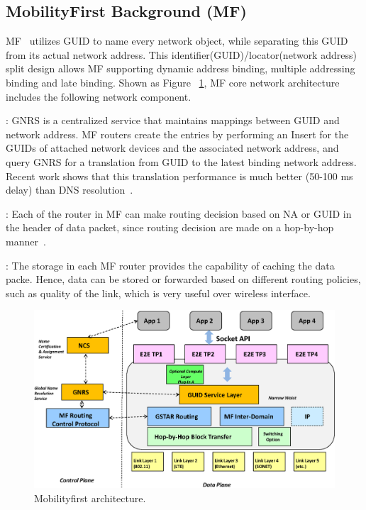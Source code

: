 \subsection{MobilityFirst Background (MF)}\label{sec:intro_mf}
MF~\cite{raychaudhuri2012mobilityfirst} utilizes GUID to name every network object, while separating this GUID from its actual network address. This identifier(GUID)/locator(network address) split design allows MF supporting dynamic address binding, multiple addressing binding and late binding. Shown as Figure ~\ref{fig:mf_arch}, MF core network architecture includes the following network component.

\vspace{1mm}: GNRS is a centralized service that maintains mappings between GUID and network address. MF routers create the entries by performing an Insert for the GUIDs of attached network devices and the associated network address, and query GNRS for a translation from GUID to the latest binding network address. Recent work shows that this translation performance is much better (50-100 ms delay) than DNS resolution~\cite{vu2012dmap}.

\vspace{1mm}: Each of the router in MF can make routing decision based on NA or GUID in the header of data packet, since routing decision are made on a hop-by-hop manner~\cite{nelson2011gstar}.

\vspace{1mm}: The storage in each MF router provides the capability of caching the data packe. Hence, data can be stored or forwarded based on different routing policies, such as quality of the link, which is very useful over wireless interface.
\begin{figure}
\centering
\includegraphics[width=\columnwidth]{figure/mf_arch.eps}
\caption{\label{fig:mf_arch}Mobilityfirst architecture.}
\end{figure}

